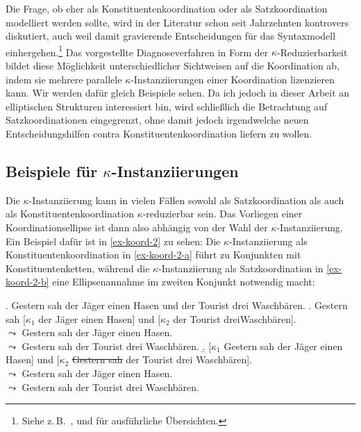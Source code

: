 Die Frage, ob  eher als Konstituentenkoordination oder als Satzkoordination modelliert werden sollte, wird in der Literatur schon seit Jahrzehnten kontrovers diskutiert, auch weil damit gravierende Entscheidungen für das Syntaxmodell einhergehen.\footnote{Siehe z.\,B.\  \citet[Kapitel~1]{Oirsouw:87}, \citet[61ff]{Wilder:97} und \citet[32ff]{Hartmann:00} für ausführliche Übersichten.} Das vorgestellte Diagnoseverfahren in Form der $\kappa$-Reduzierbarkeit bildet diese Möglichkeit unterschiedlicher Sichtweisen auf die Koordination ab, indem sie mehrere parallele $\kappa$-Instanziierungen einer Koordination lizenzieren kann. Wir werden dafür gleich Beispiele sehen. Da ich jedoch in dieser Arbeit an elliptischen Strukturen interessiert bin, wird schlie\ss lich die Betrachtung auf Satzkoordinationen eingegrenzt, ohne damit jedoch irgendwelche neuen Entscheidungshilfen contra Konstituentenkoordination liefern zu wollen. 

\subsection{Beispiele für $\kappa$-Instanziierungen}

Die $\kappa$-Instanziierung kann in vielen Fällen sowohl als Satzkoordination als auch als Konstituentenkoordination $\kappa$-reduzierbar sein. Das Vorliegen einer Koordinationsellipse ist dann also abhängig von der Wahl der $\kappa$-Instanziierung. Ein Beispiel dafür ist in \ref{ex-koord-2} zu sehen: Die $\kappa$-Instanziierung als Konstituentenkoordination in \ref{ex-koord-2-a} führt zu Konjunkten mit Konstituentenketten, während die $\kappa$-Instanziierung als Satzkoordination in \ref{ex-koord-2-b} eine Ellipsenannahme im zweiten Konjunkt notwendig macht: 

\ex. Gestern sah der Jäger einen Hasen und der Tourist drei Waschbären. \label{ex-koord-2}
\a. \label{ex-koord-2-a} Gestern sah [$\kappa_1$ der Jäger einen Hasen] und [$\kappa_2$ der Tourist drei\linebreak Waschbären]. \\
$\leadsto$ Gestern sah der Jäger einen Hasen. \\
$\leadsto$ Gestern sah der Tourist drei Waschbären. 
\b. \label{ex-koord-2-b} [$\kappa_1$ Gestern sah der Jäger einen Hasen] und [$\kappa_2$ \sout{Gestern sah} der Tourist drei Waschbären]. \\
$\leadsto$ Gestern sah der Jäger einen Hasen. \\
$\leadsto$ Gestern sah der Tourist drei Waschbären. 


